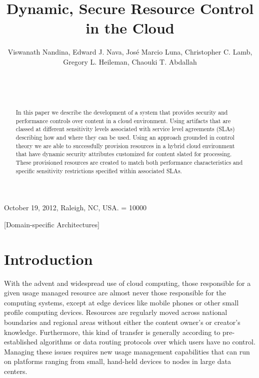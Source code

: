 \documentclass{sig-alternate}
\begin{document}
\title{Dynamic, Secure Resource Control in the Cloud}


\author{
\alignauthor
Viswanath Nandina, Edward J. Nava, Jos\'e Marcio Luna, Christopher C. Lamb, Gregory L. Heileman, Chaouki T. Abdallah\\
       \\
       \\
       \\
}

 {October 19, 2012, Raleigh, NC, USA.} 
\widowpenalty = 10000

\maketitle

\begin{abstract}
In this paper we describe the development of a system that provides security and performance controls over content in a cloud environment.  Using artifacts that are classed at different sensitivity levels associated with service level agreements (SLAs) describing how and where they can be used. Using an approach grounded in control theory we are able to successfully provision resources in a hybrid cloud environment that have dynamic security attributes customized for content slated for processing.  These provisioned resources are created to match both performance characteristics and specific sensitivity restrictions specified within associated SLAs.
\end{abstract}

[Domain-specific Architectures]

\section{Introduction}\label{sec:introduction}
With the advent and widespread use of cloud computing, those responsible for a given usage managed resource are almost never those responsible for the computing systems, except at edge devices like mobile phones or other small profile computing devices.  Resources are regularly moved across national boundaries and regional areas without either the content owner's or creator's knowledge.  Furthermore, this kind of transfer is generally according to pre-established algorithms or data routing protocols over which users have no control.  Managing these issues requires new usage management capabilities that can run on platforms ranging from small, hand-held devices to nodes in large data centers.
\end{document}
